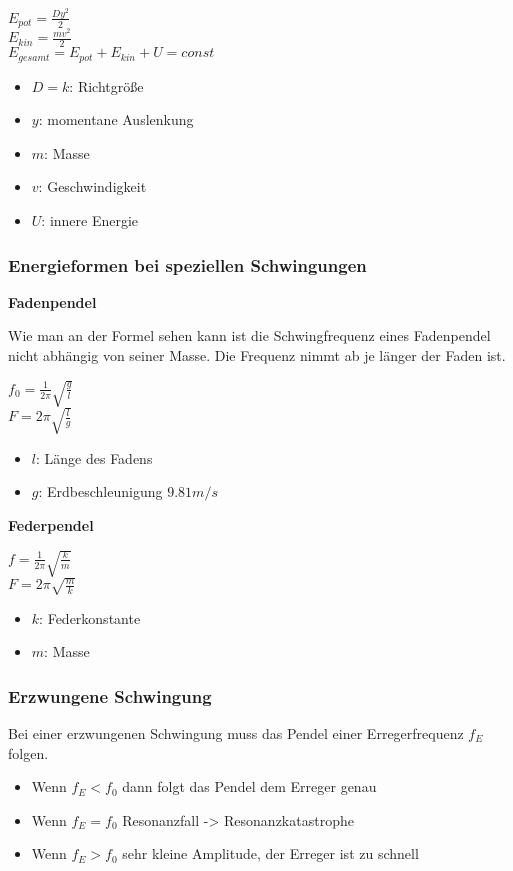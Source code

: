 \documentclass[../document.tex]{subfiles}
\begin{document}
$E_{pot} = \frac{D y^2}{2}$\\
$E_{kin} = \frac{m v^2}{2}$\\
$E_{gesamt} = E_{pot} + E_{kin} + U = const$\\

\begin{itemize}
	\item $D = k$: Richtgröße
	\item $y$: momentane Auslenkung
	\item $m$: Masse
	\item $v$: Geschwindigkeit
	\item $U$: innere Energie
\end{itemize}

\subsubsection{Energieformen bei speziellen Schwingungen}

\textbf{Fadenpendel}

Wie man an der Formel sehen kann ist die Schwingfrequenz eines Fadenpendel nicht abhängig von seiner Masse. Die Frequenz nimmt ab je länger der Faden ist.

$ f_0 = \frac{1}{2\pi} \sqrt{\frac{g}{l}}$\\
$ F = 2\pi\sqrt{\frac{l}{g}}$

\begin{itemize}
	\item $l$: Länge des Fadens
	\item $g$: Erdbeschleunigung $9.81 m/s $
\end{itemize}

\textbf{Federpendel}

$ f = \frac{1}{2\pi} \sqrt{\frac{k}{m}}$\\
$ F = 2\pi\sqrt{\frac{m}{k}}$

\begin{itemize}
	\item $k$: Federkonstante
	\item $m$: Masse
\end{itemize}

\subsubsection{Erzwungene Schwingung}

Bei einer erzwungenen Schwingung muss das Pendel einer Erregerfrequenz $f_E$ folgen.

\begin{itemize}
	\item Wenn $f_E < f_0$ dann folgt das Pendel dem Erreger genau
	\item Wenn $f_E = f_0$ Resonanzfall -> Resonanzkatastrophe
	\item Wenn $f_E > f_0$ sehr kleine Amplitude, der Erreger ist zu schnell
\end{itemize}
\end{document}
